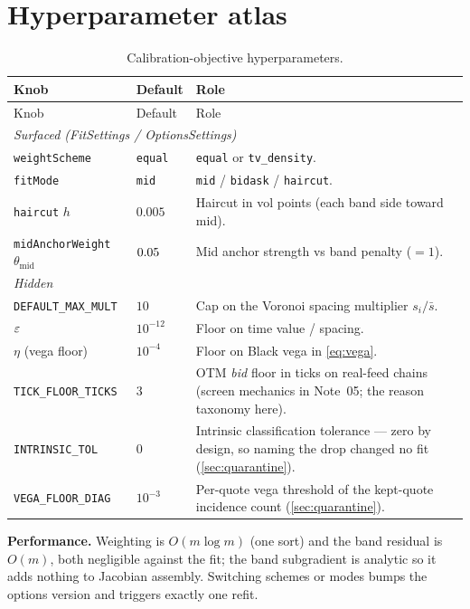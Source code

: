 \documentclass[11pt]{article}
\begin{document}
\appendix
\section{Hyperparameter atlas}
\label{app:atlas}

\begin{longtable}{p{}p{}p{}}
\caption{Calibration-objective hyperparameters.}\label{tab:atlas}\\
\toprule Knob & Default & Role\\ \midrule
\endfirsthead \toprule Knob & Default & Role\\ \midrule \endhead
\multicolumn{3}{l}{\emph{Surfaced (FitSettings / OptionsSettings)}}\\ \midrule
\texttt{weightScheme} & \texttt{equal} & \texttt{equal} or \texttt{tv\_density}.\\
\texttt{fitMode} & \texttt{mid} & \texttt{mid} / \texttt{bidask} / \texttt{haircut}.\\
\texttt{haircut} $h$ & $0.005$ & Haircut in vol points (each band side toward mid).\\
\texttt{midAnchorWeight} $\theta_{\text{mid}}$ & $0.05$ & Mid anchor strength vs band penalty ($=1$).\\
\midrule
\multicolumn{3}{l}{\emph{Hidden}}\\ \midrule
\texttt{DEFAULT\_MAX\_MULT} & $10$ & Cap on the Voronoi spacing multiplier $s_i/\bar s$.\\
$\varepsilon$ & $10^{-12}$ & Floor on time value / spacing.\\
$\eta$ (vega floor) & $10^{-4}$ & Floor on Black vega in \eqref{eq:vega}.\\
\texttt{TICK\_FLOOR\_TICKS} & $3$ & OTM \emph{bid} floor in ticks on
real-feed chains (screen mechanics in Note~05; the reason taxonomy here).\\
\texttt{INTRINSIC\_TOL} & $0$ & Intrinsic classification tolerance ---
zero by design, so naming the drop changed no fit
(\cref{sec:quarantine}).\\
\texttt{VEGA\_FLOOR\_DIAG} & $10^{-3}$ & Per-quote vega threshold of the
kept-quote incidence count (\cref{sec:quarantine}).\\
\bottomrule
\end{longtable}

\noindent\textbf{Performance.} Weighting is $O(m\log m)$ (one sort) and the band
residual is $O(m)$, both negligible against the fit; the band subgradient is
analytic so it adds nothing to Jacobian assembly. Switching schemes or modes bumps
the options version and triggers exactly one refit.
\end{document}
